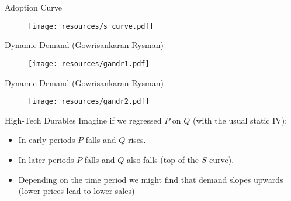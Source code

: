 \begin{frame}{Adoption Curve}
\begin{figure}[htbp]
\begin{center}
\texttt{[image: resources/s\_curve.pdf]}
\label{gandr2}
\end{center}
\end{figure}
\end{frame}

\begin{frame}{Dynamic Demand  (Gowrisankaran Rysman)}
\begin{figure}[htbp]
\begin{center}
\texttt{[image: resources/gandr1.pdf]}
\label{gandr1}
\end{center}
\end{figure}
\end{frame}

\begin{frame}{Dynamic Demand (Gowrisankaran Rysman)}
\begin{figure}[htbp]
\begin{center}
\texttt{[image: resources/gandr2.pdf]}
\label{gandr2}
\end{center}
\end{figure}
\end{frame}

\begin{frame}{High-Tech Durables}
Imagine if we regressed $P$ on $Q$ (with the usual static IV):
\begin{itemize}
\item In early periods $P$ falls and $Q$ rises.
\item In later periods $P$ falls and $Q$ also falls (top of the $S$-curve).
\item Depending on the time period we might find that demand slopes \alert{upwards} (lower prices lead to lower sales)
\end{itemize}
\end{frame}

